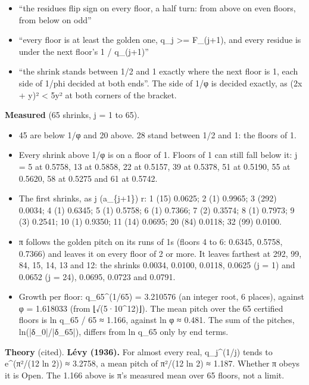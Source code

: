 \begin{itemize}
\item “the residues flip sign on every floor, a half turn: from above on even floors, from below on odd”
\item “every floor is at least the golden one, q\_\allowbreak{}j >= F\_\allowbreak{}(j+1), and every residue is under the next floor's 1 / q\_\allowbreak{}(j+1)”
\item “the shrink stands between 1/2 and 1 exactly where the next floor is 1, each side of 1/phi decided at both ends”. The side of 1/φ is decided exactly, as (2x + y)² < 5y² at both corners of the bracket.
\end{itemize}

\textbf{Measured} (65 shrinks, j = 1 to 65).

\begin{itemize}
\item 45 are below 1/φ and 20 above. 28 stand between 1/2 and 1: the floors of 1.
\item Every shrink above 1/φ is on a floor of 1. Floors of 1 can still fall below it: j = 5 at 0.5758, 13 at 0.5858, 22 at 0.5157, 39 at 0.5378, 51 at 0.5190, 55 at 0.5620, 58 at 0.5275 and 61 at 0.5742.
\item The first shrinks, as j (a\_\allowbreak{}\{j+1\}) r: 1 (15) 0.0625; 2 (1) 0.9965; 3 (292) 0.0034; 4 (1) 0.6345; 5 (1) 0.5758; 6 (1) 0.7366; 7 (2) 0.3574; 8 (1) 0.7973; 9 (3) 0.2541; 10 (1) 0.9350; 11 (14) 0.0695; 20 (84) 0.0118; 32 (99) 0.0100.
\item π follows the golden pitch on its runs of 1s (floors 4 to 6: 0.6345, 0.5758, 0.7366) and leaves it on every floor of 2 or more. It leaves farthest at 292, 99, 84, 15, 14, 13 and 12: the shrinks 0.0034, 0.0100, 0.0118, 0.0625 (j = 1) and 0.0652 (j = 24), 0.0695, 0.0723 and 0.0791.
\item Growth per floor: q\_\allowbreak{}65\textasciicircum{}(1/65) = 3.210576 (an integer root, 6 places), against φ = 1.618033 (from ⌊√(5·10\textasciicircum{}12)⌋). The mean pitch over the 65 certified floors is ln q\_\allowbreak{}65 / 65 ≈ 1.166, against ln φ ≈ 0.481. The sum of the pitches, ln(|δ\_\allowbreak{}0|/|δ\_\allowbreak{}65|), differs from ln q\_\allowbreak{}65 only by end terms.
\end{itemize}

\textbf{Theory} (cited). \textbf{Lévy (1936).} For almost every real, q\_\allowbreak{}j\textasciicircum{}(1/j) tends to e\textasciicircum{}(π²/(12 ln 2)) ≈ 3.2758, a mean pitch of π²/(12 ln 2) ≈ 1.187. Whether π obeys it is Open. The 1.166 above is π's measured mean over 65 floors, not a limit.

